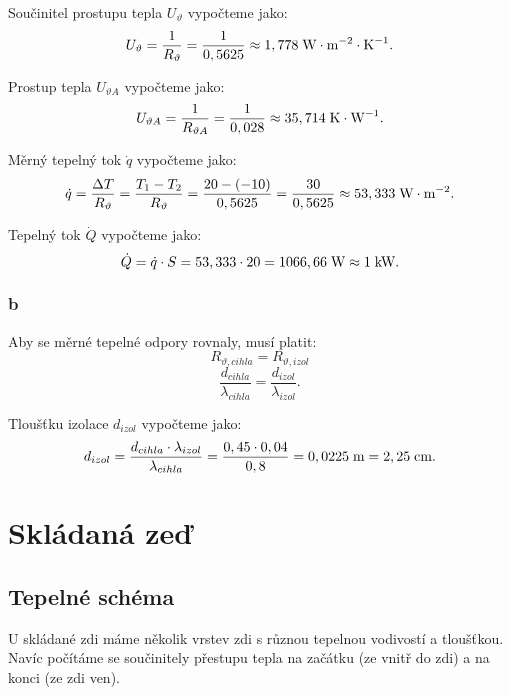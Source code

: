 \documentclass{article}
\begin{document}
Součinitel prostupu tepla $U_\vartheta$ vypočteme jako:
$$
    U_\vartheta = \frac{1}{R_{\vartheta}} = \frac{1}{0,5625} \approx 1,778 \; \textrm{W} \cdot \textrm{m}^{-2} \cdot \textrm{K}^{-1}.
$$

Prostup tepla $U_{\vartheta A}$ vypočteme jako:
$$
    U_{\vartheta A} = \frac{1}{R_{\vartheta A}} = \frac{1}{0,028} \approx 35,714 \; \textrm{K} \cdot \textrm{W}^{-1}.
$$

Měrný tepelný tok $\dot{q}$ vypočteme jako:
$$
    \dot{q} = \frac{\Delta T}{R_{\vartheta}} = \frac{T_1 - T_2}{R_{\vartheta}} = \frac{20 - (-10)}{0,5625} = \frac{30}{0,5625} \approx 53,333 \; \textrm{W} \cdot \textrm{m}^{-2}.
$$

Tepelný tok $\dot{Q}$ vypočteme jako:
$$
    \dot{Q} = \dot{q} \cdot S = 53,333 \cdot 20 = 1066,66 \; \textrm{W} \approx 1 \; \textrm{kW}.
$$


\subsubsection{b}
Aby se měrné tepelné odpory rovnaly, musí platit:
$$
    R_{\vartheta,cihla} = R_{\vartheta,izol}
$$
$$
    \frac{d_{cihla}}{\lambda_{cihla}} = \frac{d_{izol}}{\lambda_{izol}}.
$$

Tloušťku izolace $d_{izol}$ vypočteme jako:
$$
    d_{izol} = \frac{d_{cihla} \cdot \lambda_{izol}}{\lambda_{cihla}} = \frac{0,45 \cdot 0,04}{0,8} = 0,0225 \; \textrm{m} = 2,25 \; \textrm{cm}.
$$

\newpage




\section{ Skládaná zeď \spicy \spicy}



\subsection{Tepelné schéma}
U skládané zdi máme několik vrstev zdi s různou tepelnou vodivostí a tloušťkou. Navíc počítáme se součinitely přestupu tepla na začátku (ze vnitř do zdi) a na konci (ze zdi ven).
\end{document}
